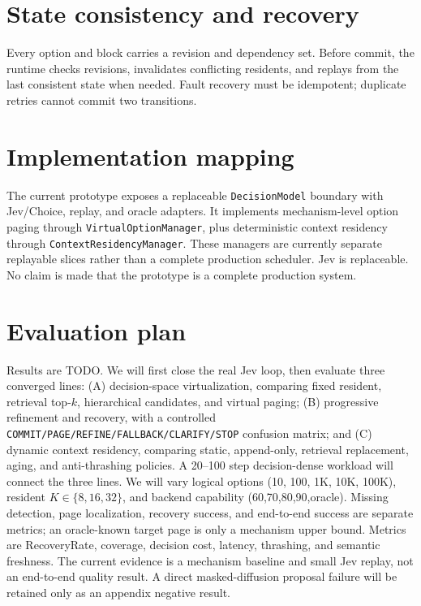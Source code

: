 \documentclass[11pt]{article}
\begin{document}
\section{State consistency and recovery}Every option and block carries a revision and dependency set. Before commit, the runtime checks revisions, invalidates conflicting residents, and replays from the last consistent state when needed. Fault recovery must be idempotent; duplicate retries cannot commit two transitions.
\section{Implementation mapping}The current prototype exposes a replaceable \texttt{DecisionModel} boundary with Jev/Choice, replay, and oracle adapters. It implements mechanism-level option paging through \texttt{VirtualOptionManager}, plus deterministic context residency through \texttt{ContextResidencyManager}. These managers are currently separate replayable slices rather than a complete production scheduler. Jev is replaceable. No claim is made that the prototype is a complete production system.
\section{Evaluation plan}Results are TODO. We will first close the real Jev loop, then evaluate three converged lines: (A) decision-space virtualization, comparing fixed resident, retrieval top-$k$, hierarchical candidates, and virtual paging; (B) progressive refinement and recovery, with a controlled \texttt{COMMIT/PAGE/REFINE/FALLBACK/CLARIFY/STOP} confusion matrix; and (C) dynamic context residency, comparing static, append-only, retrieval replacement, aging, and anti-thrashing policies. A 20--100 step decision-dense workload will connect the three lines. We will vary logical options (10, 100, 1K, 10K, 100K), resident $K\in\{8,16,32\}$, and backend capability (60,70,80,90,oracle). Missing detection, page localization, recovery success, and end-to-end success are separate metrics; an oracle-known target page is only a mechanism upper bound. Metrics are RecoveryRate, coverage, decision cost, latency, thrashing, and semantic freshness. The current evidence is a mechanism baseline and small Jev replay, not an end-to-end quality result. A direct masked-diffusion proposal failure will be retained only as an appendix negative result.
\end{document}

